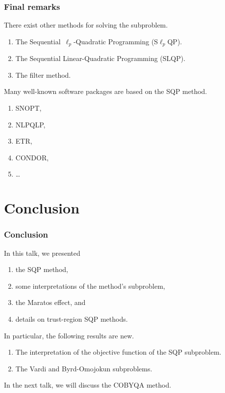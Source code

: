 \documentclass{polyu-presentation}
\begin{document}
\begin{frame}
    \frametitle{Final remarks}

    There exist \alert{other methods} for solving the subproblem.
    \begin{enumerate}
        \item The Sequential~$\ell_p$-Quadratic Programming (S$\ell_p$QP).
        \item The Sequential Linear-Quadratic Programming (SLQP).
        \item The filter method.
    \end{enumerate}

    \bigskip

    Many well-known \alert{software packages} are based on the SQP method.
    \begin{enumerate}
        \item SNOPT,
        \item NLPQLP,
        \item ETR,
        \item CONDOR,
        \item \dots
    \end{enumerate}
\end{frame}

\section{Conclusion}

\begin{frame}
    \frametitle{Conclusion}

	In this talk, we presented
    \begin{enumerate}
        \item the \alert{SQP} method,
        \item some \alert{interpretations} of the method's subproblem,
        \item the \alert{Maratos effect}, and
        \item details on \alert{trust-region SQP} methods.
    \end{enumerate}

    \bigskip

    In particular, the following results are new.
    \begin{enumerate}
        \item The \alert{interpretation} of the objective function of the SQP subproblem.
        \item The \alert{Vardi and Byrd-Omojokun} subproblems.
    \end{enumerate}

    \bigskip

    In the next talk, we will discuss the \alert{COBYQA} method.
\end{frame}


\end{document}
